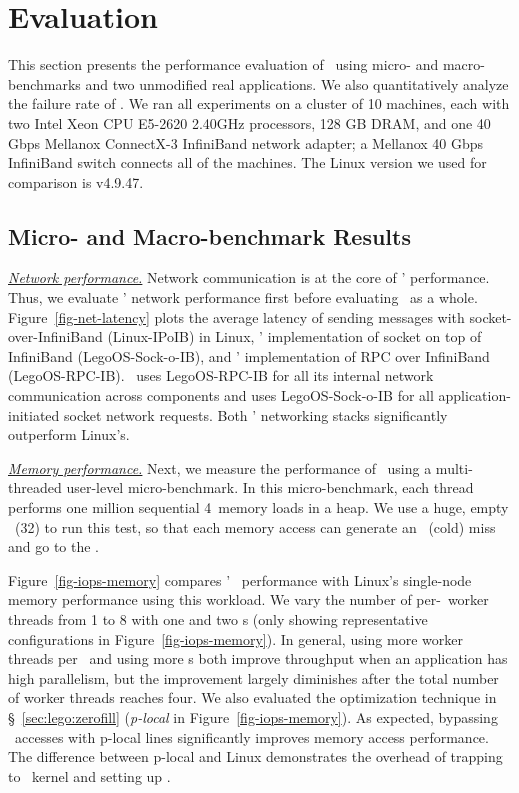 \section{Evaluation}
\label{sec:lego:results}

This section presents the performance evaluation of \lego\ using micro- and macro-benchmarks and two unmodified real applications.
We also quantitatively analyze the failure rate of \lego.
We ran all experiments on a cluster of 10 machines, each with two Intel Xeon CPU E5-2620 2.40GHz
processors, 128 GB DRAM, and one 40 Gbps Mellanox ConnectX-3 InfiniBand network adapter;
a Mellanox 40 Gbps InfiniBand switch connects all of the machines. 
The Linux version we used for comparison is v4.9.47.



\subsection{Micro- and Macro-benchmark Results}
\textit{\uline{Network performance.}}
Network communication is at the core of \lego' performance.
Thus, we evaluate \lego' network performance first before evaluating \lego\ as a whole.
Figure~\ref{fig-net-latency} plots the average latency of sending messages with socket-over-InfiniBand (Linux-IPoIB) in Linux,
\lego' implementation of socket on top of InfiniBand (LegoOS-Sock-o-IB), and \lego' implementation of RPC over InfiniBand (LegoOS-RPC-IB).
\lego\ uses LegoOS-RPC-IB for all its internal network communication across components and uses LegoOS-Sock-o-IB for 
all application-initiated socket network requests.
Both \lego' networking stacks significantly outperform Linux's.

\textit{\uline{Memory performance.}}
Next, we measure the performance of \mcomponent\ using a multi-threaded user-level micro-benchmark. 
In this micro-benchmark, each thread performs one million sequential 4\KB\ memory loads in a heap.
We use a huge, empty \excache\ (32\GB) to run this test, 
so that each memory access can generate an \excache\ (cold) miss and go to the \mcomponent.

Figure~\ref{fig-iops-memory} compares \lego' \mcomponent\ performance 
with Linux's single-node memory performance using this workload.
We vary the number of per-\mcomponent\ worker threads from 1 to 8 
with one and two \mcomponent{}s (only showing representative configurations in Figure~\ref{fig-iops-memory}).
In general, using more worker threads per \mcomponent\ and using more \mcomponent{}s both improve throughput when an application has high parallelism,
but the improvement largely diminishes after the total number of worker threads reaches four.
We also evaluated the optimization technique in \S~\ref{sec:lego:zerofill} ({\em p-local} in Figure~\ref{fig-iops-memory}).
As expected, bypassing \mcomponent\ accesses with p-local lines significantly 
improves memory access performance.
The difference between p-local and Linux demonstrates the overhead of trapping to \lego\ kernel and setting up \excache.

